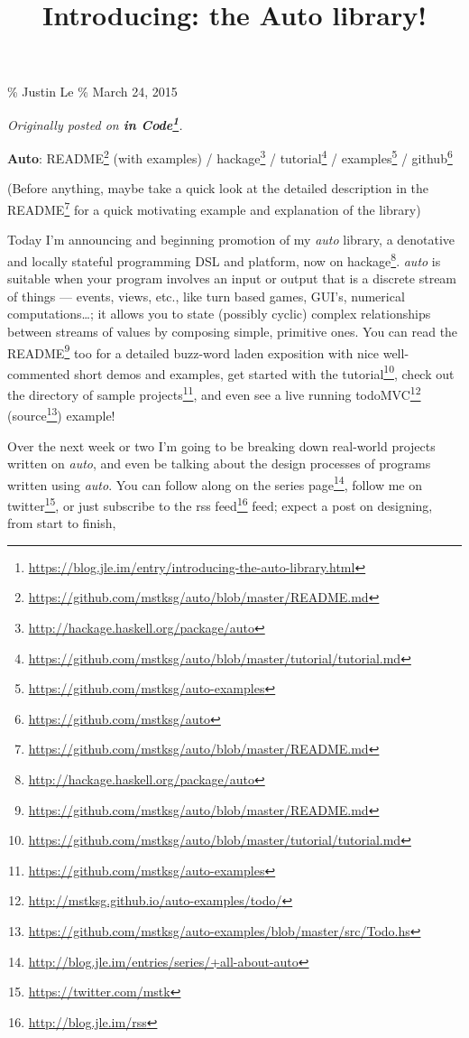 \documentclass[]{article}
\title{Introducing: the Auto library!}
\renewcommand{\href}[2]{#2\footnote{\url{#1}}}
\begin{document}
\maketitle

\% Justin Le \% March 24, 2015

\emph{Originally posted on
\textbf{\href{https://blog.jle.im/entry/introducing-the-auto-library.html}{in
Code}}.}

\textbf{Auto}:
\href{https://github.com/mstksg/auto/blob/master/README.md}{README} (with
examples) / \href{http://hackage.haskell.org/package/auto}{hackage} /
\href{https://github.com/mstksg/auto/blob/master/tutorial/tutorial.md}{tutorial}
/ \href{https://github.com/mstksg/auto-examples}{examples} /
\href{https://github.com/mstksg/auto}{github}

(Before anything, maybe take a quick look at the detailed description in the
\href{https://github.com/mstksg/auto/blob/master/README.md}{README} for a quick
motivating example and explanation of the library)

Today I'm announcing and beginning promotion of my \emph{auto} library, a
denotative and locally stateful programming DSL and platform, now
\href{http://hackage.haskell.org/package/auto}{on hackage}. \emph{auto} is
suitable when your program involves an input or output that is a discrete stream
of things --- events, views, etc., like turn based games, GUI's, numerical
computations\ldots; it allows you to state (possibly cyclic) complex
relationships between streams of values by composing simple, primitive ones. You
can read the \href{https://github.com/mstksg/auto/blob/master/README.md}{README}
too for a detailed buzz-word laden exposition with nice well-commented short
demos and examples, get started with
\href{https://github.com/mstksg/auto/blob/master/tutorial/tutorial.md}{the
tutorial}, check out the directory of
\href{https://github.com/mstksg/auto-examples}{sample projects}, and even see a
live running \href{http://mstksg.github.io/auto-examples/todo/}{todoMVC}
(\href{https://github.com/mstksg/auto-examples/blob/master/src/Todo.hs}{source})
example!

Over the next week or two I'm going to be breaking down real-world projects
written on \emph{auto}, and even be talking about the design processes of
programs written using \emph{auto}. You can follow along on
\href{http://blog.jle.im/entries/series/+all-about-auto}{the series page},
follow me on \href{https://twitter.com/mstk}{twitter}, or just subscribe to the
\href{http://blog.jle.im/rss}{rss feed} feed; expect a post on designing, from
start to finish,
\end{document}
